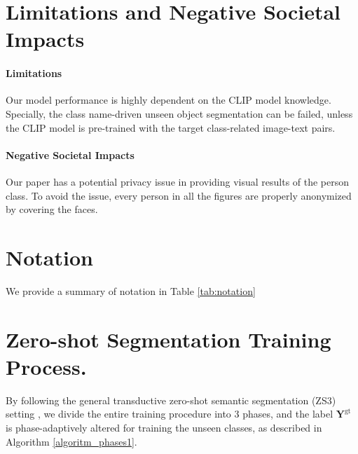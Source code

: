 \documentclass[nohyperref]{article}
\newcommand{\gty}{\mbf{Y}^{\text{gt}}}
\newcommand{\mbf}{\mathbf}
\theoremstyle{plain}
\theoremstyle{definition}
\theoremstyle{remark}
\begin{document}
\section{Limitations and Negative Societal Impacts}
\label{appen_limit}
\paragraph{Limitations}
Our model performance is highly dependent on the CLIP model knowledge. Specially, the class name-driven unseen object segmentation can be failed, unless the CLIP model is pre-trained with the target class-related image-text pairs.


\paragraph{Negative Societal Impacts}
Our paper has a potential privacy issue in providing visual results of the person class. To avoid the issue, every person in all the figures are properly anonymized by covering the faces.



\section{Notation} \label{apppendix:notation}
We provide a summary of notation in Table \ref{tab:notation}





\section{Zero-shot Segmentation Training Process.} \label{sec_phase}

By following the general transductive zero-shot semantic segmentation (ZS3) setting \cite{pastore2021strict, zhou2022maskclip, zhou2022zegclip}, we divide the entire training procedure into 3 phases, 
and the label $\gty$ is phase-adaptively altered for training the unseen classes, as described in Algorithm \ref{algoritm_phases1}.
\end{document}
